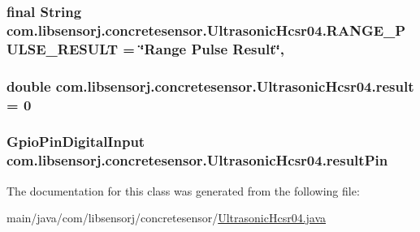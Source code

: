 \subsubsection[{R\+A\+N\+G\+E\+\_\+\+P\+U\+L\+S\+E\+\_\+\+R\+E\+S\+U\+L\+T}]{\setlength{\rightskip}{0pt plus 5cm}final String com.\+libsensorj.\+concretesensor.\+Ultrasonic\+Hcsr04.\+R\+A\+N\+G\+E\+\_\+\+P\+U\+L\+S\+E\+\_\+\+R\+E\+S\+U\+L\+T = \char`\"{}Range Pulse Result\char`\"{}\hspace{0.3cm}{\ttfamily [static]}, {\ttfamily [private]}}\label{classcom_1_1libsensorj_1_1concretesensor_1_1UltrasonicHcsr04_a5830907d5ffebb25e4f034db830666df}
\hypertarget{classcom_1_1libsensorj_1_1concretesensor_1_1UltrasonicHcsr04_aad32f417f9106fa8f3f2e2a7416f033b}{}
\subsubsection[{result}]{\setlength{\rightskip}{0pt plus 5cm}double com.\+libsensorj.\+concretesensor.\+Ultrasonic\+Hcsr04.\+result = 0\hspace{0.3cm}{\ttfamily [private]}}\label{classcom_1_1libsensorj_1_1concretesensor_1_1UltrasonicHcsr04_aad32f417f9106fa8f3f2e2a7416f033b}
\hypertarget{classcom_1_1libsensorj_1_1concretesensor_1_1UltrasonicHcsr04_ae9065bb5c2cdf04f273996ffbb2b75af}{}
\subsubsection[{result\+Pin}]{\setlength{\rightskip}{0pt plus 5cm}Gpio\+Pin\+Digital\+Input com.\+libsensorj.\+concretesensor.\+Ultrasonic\+Hcsr04.\+result\+Pin\hspace{0.3cm}{\ttfamily [private]}}\label{classcom_1_1libsensorj_1_1concretesensor_1_1UltrasonicHcsr04_ae9065bb5c2cdf04f273996ffbb2b75af}


The documentation for this class was generated from the following file\+:\begin{DoxyCompactItemize}
\item 
main/java/com/libsensorj/concretesensor/\hyperlink{UltrasonicHcsr04_8java}{Ultrasonic\+Hcsr04.\+java}\end{DoxyCompactItemize}
